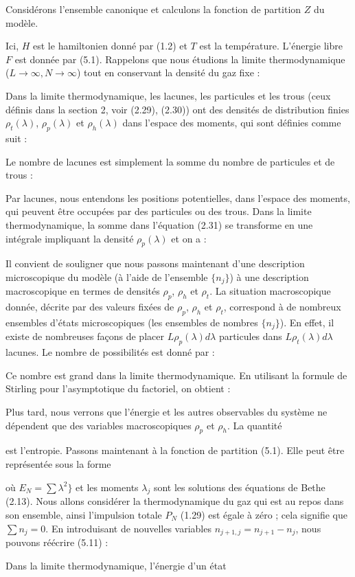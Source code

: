 Considérons l'ensemble canonique et calculons la fonction de partition $Z$ du modèle.

Ici, $H$ est le hamiltonien donné par (1.2) et $T$ est la température.  
L'énergie libre $F$ est donnée par (5.1). Rappelons que nous étudions  
la limite thermodynamique ($L \to \infty, N \to \infty$) tout en conservant  
la densité du gaz fixe :

Dans la limite thermodynamique, les lacunes, les particules et les trous  
(ceux définis dans la section 2, voir (2.29), (2.30)) ont des densités de  
distribution finies $\rho_t(\lambda)$, $\rho_p(\lambda)$ et $\rho_h(\lambda)$  
dans l'espace des moments, qui sont définies comme suit :

Le nombre de lacunes est simplement la somme du nombre de particules  
et de trous :

Par lacunes, nous entendons les positions potentielles, dans l'espace des moments,  
qui peuvent être occupées par des particules ou des trous. Dans la limite thermodynamique,  
la somme dans l'équation (2.31) se transforme en une intégrale impliquant la densité $\rho_p(\lambda)$  
et on a :

Il convient de souligner que nous passons maintenant d'une description microscopique  
du modèle (à l'aide de l'ensemble $\{n_j\}$) à une description macroscopique  
en termes de densités $\rho_p$, $\rho_h$ et $\rho_t$.  
La situation macroscopique donnée, décrite par des valeurs fixées de $\rho_p$, $\rho_h$ et $\rho_t$,  
correspond à de nombreux ensembles d'états microscopiques (les ensembles de nombres $\{n_j\}$).  
En effet, il existe de nombreuses façons de placer $L \rho_p(\lambda) d\lambda$ particules  
dans $L \rho_t(\lambda) d\lambda$ lacunes. Le nombre de possibilités est donné par :

Ce nombre est grand dans la limite thermodynamique.  
En utilisant la formule de Stirling pour l'asymptotique du factoriel, on obtient :

Plus tard, nous verrons que l'énergie et les autres observables du système 
ne dépendent que des variables macroscopiques \( \rho_p \) et \( \rho_h \). La quantité

est l'entropie. Passons maintenant à la fonction de partition (5.1). Elle peut être 
représentée sous la forme

où \( E_N = \sum \lambda^2 \} \) et les moments \( \lambda_j \) sont les solutions des équations de Bethe (2.13). 
Nous allons considérer la thermodynamique du gaz qui est au repos dans son ensemble, 
ainsi l'impulsion totale \( P_N \) (1.29) est égale à zéro ; cela signifie que \( \sum n_j = 0 \). 
En introduisant de nouvelles variables \( n_{j+1 , j} = n_{j+1} - n_j \), nous pouvons réécrire (5.11) :

Dans la limite thermodynamique, l'énergie d'un état



